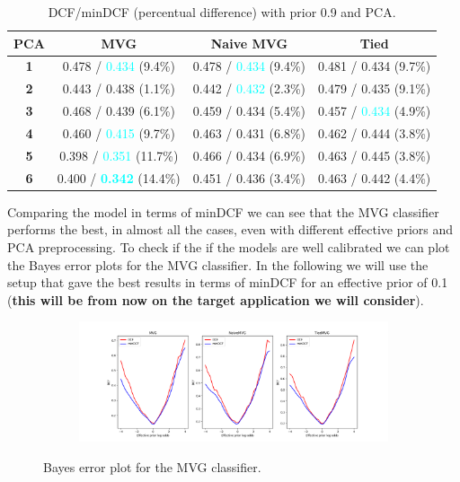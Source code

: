 \documentclass[12pt]{report}
\newcommand{\nnl}{%
    \newline
    \newline
}
\begin{document}
\begin{table}[H]
    \centering
    \begin{tabular}{|c|c|c|c|}
        \hline
        \rowcolor{blue!10}
        \textbf{PCA} & \textbf{MVG}                                      & \textbf{Naive MVG}                      & \textbf{Tied}                           \\
        \hline
        \textbf{1}   & 0.478 / \textcolor{cyan}{0.434} (9.4\%)           & 0.478 / \textcolor{cyan}{0.434} (9.4\%) & 0.481 / 0.434 (9.7\%)                   \\
        \hline
        \textbf{2}   & 0.443 / 0.438 (1.1\%)                             & 0.442 / \textcolor{cyan}{0.432} (2.3\%) & 0.479 / 0.435 (9.1\%)                   \\
        \hline
        \textbf{3}   & 0.468 / 0.439 (6.1\%)                             & 0.459 / 0.434 (5.4\%)                   & 0.457 / \textcolor{cyan}{0.434} (4.9\%) \\
        \hline
        \textbf{4}   & 0.460 / \textcolor{cyan}{0.415} (9.7\%)           & 0.463 / 0.431 (6.8\%)                   & 0.462 / 0.444 (3.8\%)                   \\
        \hline
        \textbf{5}   & 0.398 / \textcolor{cyan}{0.351} (11.7\%)          & 0.466 / 0.434 (6.9\%)                   & 0.463 / 0.445 (3.8\%)                   \\
        \hline
        \textbf{6}   & 0.400 / \textcolor{cyan}{\textbf{0.342}} (14.4\%) & 0.451 / 0.436 (3.4\%)                   & 0.463 / 0.442 (4.4\%)                   \\
        \hline
    \end{tabular}
    \caption{DCF/minDCF (percentual difference) with prior 0.9 and PCA.}
    \label{tab:DCF_MVG_PCA_0.9}
\end{table}
\noindent
Comparing the model in terms of minDCF we can see that the MVG classifier performs the best, in almost all the cases, even with different effective priors and PCA preprocessing.
\nnl To check if the if the models are well calibrated we can plot the Bayes error plots for the MVG classifier. In the following we will use the setup that gave the best results in terms of minDCF for an effective prior of 0.1 (\textbf{this will be from now on the target application we will consider}).
\begin{figure}[H]
    \centering
    \begin{subfigure}[t]{1\textwidth}
        \includegraphics[width=\textwidth]{./plot/MVG/bayes_plot.png}
    \end{subfigure}
    \caption{Bayes error plot for the MVG classifier.}
    \label{fig:bayes_error_MVG}
\end{figure}
\end{document}

